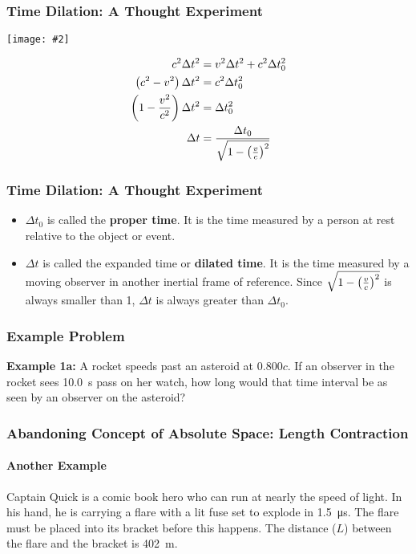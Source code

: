 \documentclass[12pt,compress,aspectratio=169]{beamer}
\newcommand{\pic}[2]{\texttt{[image: \#2]}}
\newcommand{\bigsqrt}{\ensuremath\sqrt{1-\left(\frac{v}{c}\right)^2}}
\newcommand{\eq}[2]{\vspace{#1}{\Large\begin{displaymath}#2\end{displaymath}}}
\begin{document}
\begin{frame}
  \frametitle{Time Dilation: A Thought Experiment}
  \begin{center}
    \pic{.7}{graphics/dilation.png}
  \end{center}
  \begin{align*}
    c^2\Delta t^2 &=v^2\Delta t^2 + c^2\Delta t_0^2\\
    \left(c^2-v^2\right)\Delta t^2 &=c^2\Delta t_0^2\\
    \left(1-\frac{v^2}{c^2}\right)\Delta t^2 &=\Delta t_0^2\\
    \Delta t &=\frac{\Delta t_0}{\bigsqrt}
  \end{align*}
\end{frame}


\begin{frame}
  \frametitle{Time Dilation: A Thought Experiment}
  
  \eq{-.2in}{
    \boxed{\Delta t =\frac{\Delta t_0}{\bigsqrt}}
  }
  \begin{itemize}
  \item $\Delta t_0$ is called the \textbf{proper time}. It is the time measured
    by a person at rest relative to the object or event.
  \item $\Delta t$ is called the expanded time or \textbf{dilated time}. It is 
    the time measured by a moving observer in another inertial frame of
    reference. Since $\bigsqrt$ is always smaller than 1, $\Delta t$ is always
    greater than $\Delta t_0$.
  \end{itemize}
\end{frame}

\begin{frame}
  \frametitle{Example Problem}
  \textbf{Example 1a:} A rocket speeds past an asteroid at $0.800c$. If an
  observer in the rocket sees \SI{10.0}{s} pass on her watch, how long would
  that time interval be as seen by an observer on the asteroid?



\end{frame}

\begin{frame}
  \frametitle{Abandoning Concept of Absolute Space: Length Contraction}
  \framesubtitle{Another Example}
  Captain Quick is a comic book hero who can run at nearly the speed of light.
  In his hand, he is carrying a flare with a lit fuse set to explode in
  \SI{1.5}{\micro\second}. The flare must be placed into its bracket before this
  happens. The distance ($L$) between the flare and the bracket is
  \SI{402}{\metre}.
\end{frame}
\end{document}
